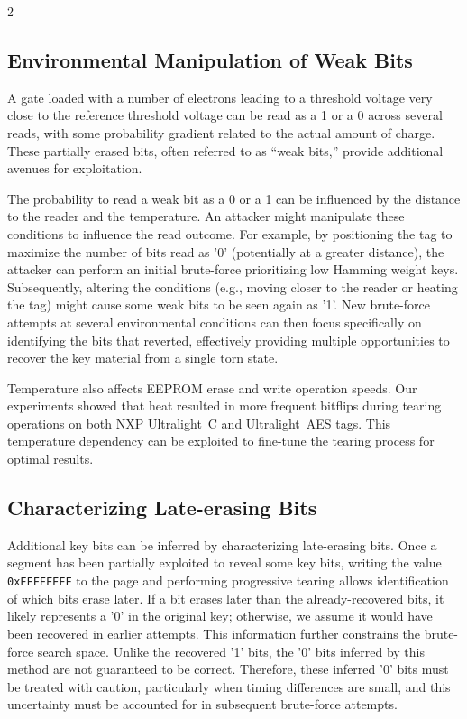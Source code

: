 \documentclass[10pt,letterpaper]{article}
\begin{document}
\begin{multicols}{2}
\subsection{Environmental Manipulation of Weak Bits}
\label{sec:envweak}
A gate loaded with a number of electrons leading to a threshold voltage very close to the reference threshold voltage can be read as a 1 or a 0 across several reads, with some probability gradient related to the actual amount of charge. These partially erased bits, often referred to as ``weak bits,'' provide additional avenues for exploitation.

The probability to read a weak bit as a 0 or a 1 can be influenced by the distance to the reader and the temperature. An attacker might manipulate these conditions to influence the read outcome. For example, by positioning the tag to maximize the number of bits read as '0' (potentially at a greater distance), the attacker can perform an initial brute-force prioritizing low Hamming weight keys. Subsequently, altering the conditions (e.g., moving closer to the reader or heating the tag) might cause some weak bits to be seen again as '1'. New brute-force attempts at several environmental conditions can then focus specifically on identifying the bits that reverted, effectively providing multiple opportunities to recover the key material from a single torn state.

Temperature also affects EEPROM erase and write operation speeds. Our experiments showed that heat resulted in more frequent bitflips during tearing operations on both NXP Ultralight~C and Ultralight~AES tags. This temperature dependency can be exploited to fine-tune the tearing process for optimal results.

\subsection{Characterizing Late-erasing Bits}
\label{sec:lateerase}
Additional key bits can be inferred by characterizing late-erasing bits. Once a segment has been partially exploited to reveal some key bits, writing the value \texttt{0xFFFFFFFF} to the page and performing progressive tearing allows identification of which bits erase later. If a bit erases later than the already-recovered bits, it likely represents a '0' in the original key; otherwise, we assume it would have been recovered in earlier attempts. This information further constrains the brute-force search space.
Unlike the recovered '1' bits, the '0' bits inferred by this method are not guaranteed to be correct. Therefore, these inferred '0' bits must be treated with caution, particularly when timing differences are small, and this uncertainty must be accounted for in subsequent brute-force attempts.


\end{multicols}
\end{document}
